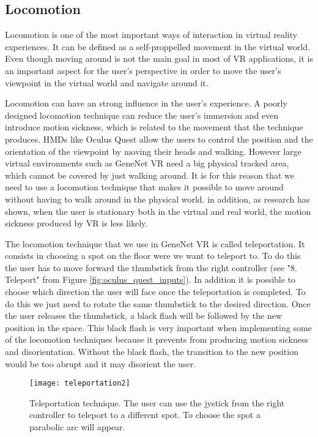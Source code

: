 \subsection{Locomotion}
Locomotion is one of the most important ways of interaction in virtual reality experiences. It can be defined as a self-proppelled movement in the virtual world. Even though moving around is not the main goal in most of VR applications, it is an important aspect for the user's perspective in order to move the user's viewpoint in the virtual world and navigate around it.

Locomotion can have an strong influence in the user's experience. A poorly designed locomotion technique can reduce the user's immersion and even introduce motion sickness, which is related to the movement that the technique produces. HMDs like Oculus Quest allow the users to control the position and the orientation of the viewpoint by moving their heads and walking. However large virtual environments such as GeneNet VR need a big physical tracked area, which cannot be covered by just walking around. It is for this reason that we need to use a locomotion technique that makes it possible to move around without having to walk around in the physical world\cite{locomotion_technique}. in addition, as research has shown, when the user is stationary both in the virtual and real world, the motion sickness produced by VR is less likely\cite{effect_vr_sickness}.

The locomotion technique that we use in GeneNet VR is called teleportation. It consists in choosing a spot on the floor were we want to teleport to. To do this the user has to move forward the thumbstick from the right controller (see "8. Teleport" from Figure \ref{fig:oculus_quest_inputs}). In addition it is possible to choose which direction the user will face once the teleportation is completed. To do this we just need to rotate the same thumbstick to the desired direction. Once the user releases the thumbstick, a black flash will be followed by the new position in the space. This black flash is very important when implementing some of the locomotion techniques because it prevents from producing motion sickness and disorientation. Without the black flash, the transition to the new position would be too abrupt and it may disorient the user.

\begin{figure}[h!]
    \centering%
    \texttt{[image: teleportation2]}
    \caption{Teleportation technique. The user can use the jystick from the right controller to teleport to a different spot. To choose the spot a parabolic arc will appear.}
    \label{fig:teleportation}
\end{figure}%

